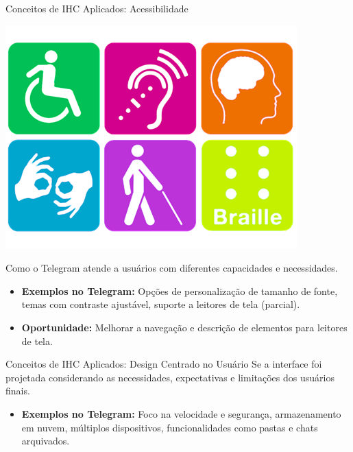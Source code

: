 \documentclass[aspectratio=169,xcolor=table]{beamer}
\begin{document}
\begin{frame}{Conceitos de IHC Aplicados: Acessibilidade}
    \begin{center}
        \includegraphics[height=0.4\textheight]{acessibilidade.png}
    \end{center}
    
    Como o Telegram atende a usuários com diferentes capacidades e necessidades.
    
    \begin{itemize}
        \item \textbf{Exemplos no Telegram:} Opções de personalização de tamanho de fonte, temas com contraste ajustável, suporte a leitores de tela (parcial).
        \item \textbf{Oportunidade:} Melhorar a navegação e descrição de elementos para leitores de tela.
    \end{itemize}
\end{frame}

\begin{frame}{Conceitos de IHC Aplicados: Design Centrado no Usuário}    
    Se a interface foi projetada considerando as necessidades, expectativas e limitações dos usuários finais.
    
    \begin{itemize}
        \item \textbf{Exemplos no Telegram:} Foco na velocidade e segurança, armazenamento em nuvem, múltiplos dispositivos, funcionalidades como pastas e chats arquivados.
    \end{itemize}
\end{frame}
\end{document}
